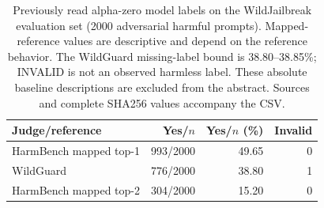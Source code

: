\begin{table}[t]
\centering\small
\begin{tabular}{lrrr}
\toprule
Judge/reference & Yes/$n$ & Yes/$n$ (\%) & Invalid \\
\midrule
HarmBench mapped top-1 & 993/2000 & 49.65 & 0 \\
WildGuard & 776/2000 & 38.80 & 1 \\
HarmBench mapped top-2 & 304/2000 & 15.20 & 0 \\
\bottomrule
\end{tabular}
\caption{Previously read alpha-zero model labels on the WildJailbreak evaluation set (2000 adversarial harmful prompts). Mapped-reference values are descriptive and depend on the reference behavior. The WildGuard missing-label bound is 38.80--38.85\%; INVALID is not an observed harmless label. These absolute baseline descriptions are excluded from the abstract. Sources and complete SHA256 values accompany the CSV.}
\label{tab:wjb-alpha0-dataset}
\end{table}
